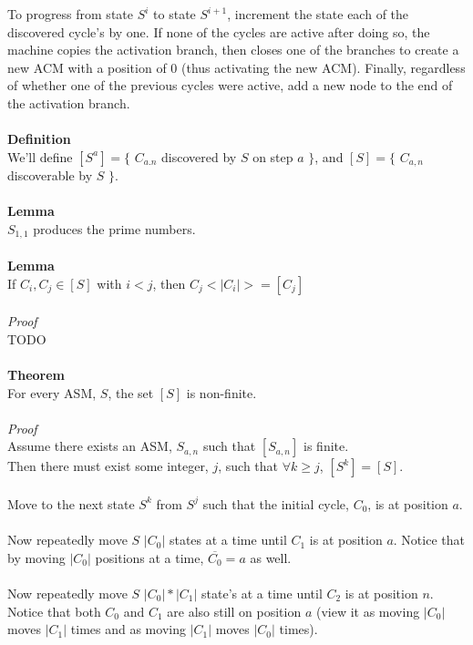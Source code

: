\documentclass[a4paper,12pt]{article}
\begin{document}
To progress from state $S^i$ to state $S^{i+1}$, increment the state each of the discovered cycle's by one. If none of the cycles are active after doing so, the machine copies the activation branch, then closes one of the branches to create a new ACM with a position of $0$ (thus activating the new ACM). Finally, regardless of whether one of the previous cycles were active, add a new node to the end of the activation branch.\\
\\
\textbf{Definition}\\  
We'll define $[S^a] = \{$ $C_{a.n}$ discovered by $S$ on step $a$ $\}$, and $[S] = \{$ $C_{a,n}$ discoverable by $S$ $\}$.\\
\\
\textbf{Lemma}\\
$S_{1,1}$ produces the prime numbers.\\
\\
\textbf{Lemma}\\
If $C_i, C_j \in [S]$ with $i < j$, then $C_j<|C_i|> = [C_j]$\\
\\
\textit{Proof}\\  
TODO\\
\\
\textbf{Theorem}\\
For every ASM, $S$, the set $[S]$ is non-finite.\\
\\
\textit{Proof}\\  
Assume there exists an ASM, $S_{a,n}$ such that $[S_{a,n}]$ is finite.\\
Then there must exist some integer, $j$, such that $\forall k \geq j$, $[S^k] = [S]$.\\
\\
Move to the next state $S^k$ from $S^j$ such that the initial cycle, $C_0$, is at position $a$.\\
\\
Now repeatedly move $S$ $|C_0|$ states at a time until $C_1$ is at position $a$. Notice that by moving $|C_0|$ positions at a time, $\overline{C_0} = a$ as well.\\
\\
Now repeatedly move $S$ $|C_0|*|C_1|$ state's at a time until $C_2$ is at position $n$. Notice that both $C_0$ and $C_1$ are also still on position $a$ (view it as moving $|C_0|$ moves $|C_1|$ times and as moving $|C_1|$ moves $|C_0|$ times).\\
\\
\end{document}
